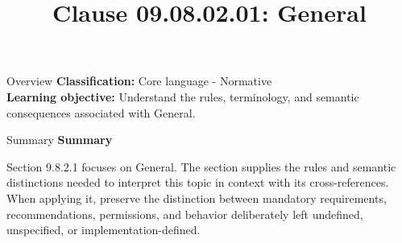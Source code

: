\documentclass[10pt,letterpaper]{article}
\title{Clause 09.08.02.01: General}
\author{}
\date{}
\begin{document}
\maketitle
\begin{CornellOverviewBox}{Overview}
\textbf{Classification:} Core language - Normative\\[2pt]
\textbf{Learning objective:} Understand the rules, terminology, and semantic consequences associated with General.
\end{CornellOverviewBox}\begin{CornellSummaryBox}{Summary}
{\sffamily\bfseries\color{Accent} Summary}\par\vspace{3pt}Section 9.8.2.1 focuses on General. The section supplies the rules and semantic distinctions needed to interpret this topic in context with its cross-references. When applying it, preserve the distinction between mandatory requirements, recommendations, permissions, and behavior deliberately left undefined, unspecified, or implementation-defined.
\end{CornellSummaryBox}
\end{document}
